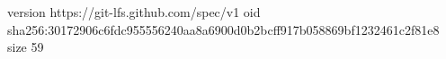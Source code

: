 version https://git-lfs.github.com/spec/v1
oid sha256:30172906c6fdc955556240aa8a6900d0b2bcff917b058869bf1232461c2f81e8
size 59
